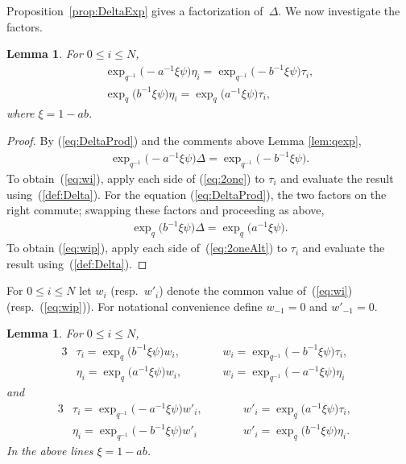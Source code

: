 \documentclass[pdftex]{sigma}
\numberwithin{equation}{section}
\newtheorem{Lemma}[Theorem]{Lemma}
\begin{document}
Proposition~\ref{prop:DeltaExp} gives a factorization of~$\Delta$.
We now investigate the factors.

\begin{Lemma}\label{lem:factors}
For $0 \leq i \leq N$,
\begin{gather}
\exp_{q^{-1}} \big({-}a^{-1} \xi \psi \big) \eta_i=
\exp_{q^{-1}} \big({-}b^{-1} \xi \psi \big) \tau_i,\label{eq:wi}
\\
\exp_{q} \big(b^{-1} \xi \psi \big) \eta_i
=
\exp_{q} \big(a^{-1} \xi \psi \big) \tau_i,
\label{eq:wip}
\end{gather}
where $\xi = 1-ab$.
\end{Lemma}
\begin{proof} By
(\ref{eq:DeltaProd}) and the comments above Lemma
\ref{lem:qexp},
\begin{gather}
\exp_{q^{-1}} \big({-}a^{-1} \xi \psi \big) \Delta =
\exp_{q^{-1}} \big({-}b^{-1} \xi \psi \big).
\label{eq:2one}
\end{gather}
To obtain~(\ref{eq:wi}),
apply each side of
(\ref{eq:2one}) to $\tau_i$ and evaluate the result using~(\ref{def:Delta}).
For the equation
(\ref{eq:DeltaProd}), the two factors on the right commute; swapping
these factors and proceeding as above,
\begin{gather}
\exp_{q} \big(b^{-1} \xi \psi \big) \Delta =\exp_{q} \big(a^{-1} \xi \psi \big).\label{eq:2oneAlt}
\end{gather}
To obtain (\ref{eq:wip}), apply each side of~(\ref{eq:2oneAlt}) to $\tau_i$ and evaluate the result using~(\ref{def:Delta}).
\end{proof}

\begin{Definition}\label{def:wi}
For $0 \leq i \leq N$ let $w_i$ (resp.~$w'_i$) denote
the common value of~(\ref{eq:wi}) (resp.~(\ref{eq:wip})).
For notational convenience define $w_{-1}=0$ and $w'_{-1}=0$.
\end{Definition}

\begin{Lemma}\label{lem:four}
For $0 \leq i \leq N$,
\begin{alignat*}{3}
& \tau_i =\exp_{q} \big(b^{-1} \xi \psi \big) w_i,
\qquad &&
w_i =
\exp_{q^{-1}} \big({-}b^{-1} \xi \psi \big) \tau_i,&\\
& \eta_i =
\exp_{q} \big(a^{-1} \xi \psi \big) w_i,
\qquad &&
w_i =
\exp_{q^{-1}} \big({-}a^{-1} \xi \psi \big) \eta_i&
\end{alignat*}
and
\begin{alignat*}{3}
& \tau_i =
\exp_{q^{-1}} \big({-}a^{-1} \xi \psi \big) w'_i,
\qquad &&
w'_i
=
\exp_{q} \big(a^{-1} \xi \psi \big) \tau_i,&\\
& \eta_i=
\exp_{q^{-1}} \big({-}b^{-1} \xi \psi \big) w'_i
\qquad &&
w'_i =
\exp_{q} \big(b^{-1} \xi \psi \big) \eta_i.&
\end{alignat*}
In the above lines $\xi = 1-ab$.
\end{Lemma}
\end{document}

